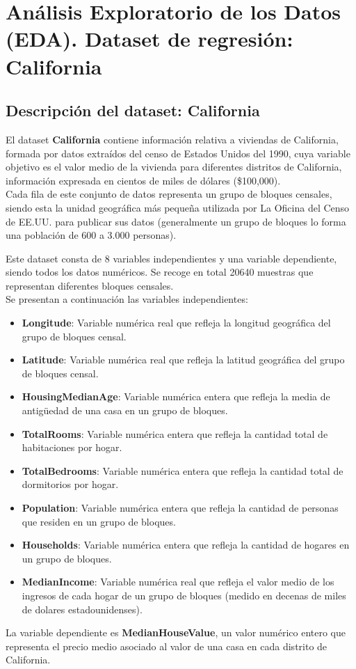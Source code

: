 \chapter{Análisis Exploratorio de los Datos (EDA). Dataset de regresión: California}

\section{Descripción del dataset: California}
El dataset \textbf{California} contiene información relativa a viviendas de California, formada por datos extraídos del censo de Estados Unidos del 1990, cuya variable objetivo es el valor medio de la vivienda para diferentes distritos de California, información expresada en cientos de miles de dólares (\$100,000). \\
Cada fila de este conjunto de datos representa un grupo de bloques censales, siendo esta la unidad geográfica más pequeña utilizada por La Oficina del Censo de EE.UU. para publicar sus datos (generalmente un grupo de bloques lo forma una población de 600 a 3.000 personas). \cite{3}

\vspace{0.5cm}
Este dataset consta de 8 variables independientes y una variable dependiente, siendo todos los datos numéricos. Se recoge en total 20640 muestras que representan diferentes bloques censales.\\
Se presentan a continuación las variables independientes:
\begin{itemize}
	\item \textbf{Longitude}: Variable numérica real que refleja la longitud geográfica del grupo de bloques censal.
	\item \textbf{Latitude}: Variable numérica real que refleja la latitud geográfica del grupo de bloques censal.
	\item \textbf{HousingMedianAge}: Variable numérica entera que refleja la media de antigüedad de una casa en un grupo de bloques.
	\item \textbf{TotalRooms}: Variable numérica entera que refleja la cantidad total de habitaciones por hogar.
	\item \textbf{TotalBedrooms}: Variable numérica entera que refleja la cantidad total de dormitorios por hogar.
	\item \textbf{Population}: Variable numérica entera que refleja la cantidad de personas que residen en un grupo de bloques.
	\item \textbf{Households}: Variable numérica entera que refleja la cantidad de hogares en un grupo de bloques.
	\item \textbf{MedianIncome}: Variable numérica real que refleja el valor medio de los ingresos de cada hogar de un grupo de bloques (medido en decenas de miles de dolares estadounidenses).
\end{itemize}
La variable dependiente es \textbf{MedianHouseValue}, un valor numérico entero que representa el precio medio asociado al valor de una casa en cada distrito de California. \cite{4}




